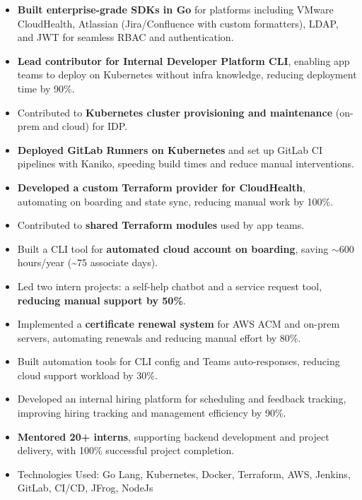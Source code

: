 \begin{itemize}
    \item \textbf{Built enterprise-grade SDKs in Go} for platforms including VMware CloudHealth, Atlassian (Jira/Confluence with custom formatters), LDAP, and JWT for seamless RBAC and authentication.
    \item \textbf{Lead contributor for Internal Developer Platform CLI}, enabling app teams to deploy on Kubernetes without infra knowledge, reducing deployment time by 90\%.
    \item Contributed to \textbf{Kubernetes cluster provisioning and maintenance} (on-prem and cloud) for IDP.
    \item \textbf{Deployed GitLab Runners on Kubernetes} and set up GitLab CI pipelines with Kaniko, speeding build times and reduce manual interventions.
    \item \textbf{Developed a custom Terraform provider for CloudHealth}, automating on boarding and state sync, reducing manual work by 100\%.
    \item Contributed to \textbf{shared Terraform modules} used by app teams.
    \item Built a CLI tool for \textbf{automated cloud account on boarding}, saving $\sim$600 hours/year (\textasciitilde 75 associate days).
    \item Led two intern projects: a self-help chatbot and a service request tool, \textbf{reducing manual support by 50\%}.
    \item Implemented a \textbf{certificate renewal system} for AWS ACM and on-prem servers, automating renewals and reducing manual effort by 80\%.
    \item Built automation tools for CLI config and Teams auto-responses, reducing cloud support workload by 30\%.
    \item Developed an internal hiring platform for scheduling and feedback tracking, improving hiring tracking and management efficiency by 90\%.
    \item \textbf{Mentored 20+ interns}, supporting backend development and project delivery, with 100\% successful project completion.
    \item Technologies Used: Go Lang, Kubernetes, Docker, Terraform, AWS, Jenkins, GitLab, CI/CD, JFrog, NodeJs
\end{itemize}


